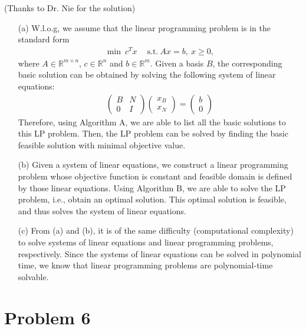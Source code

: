 \documentclass[12pt]{article}
\begin{document}
(Thanks to Dr. Nie for the solution)

\begin{itemize}
	\item[(a)] W.l.o.g, we assume that the linear programming problem is in the standard form \begin{align*}
	\min ~c^Tx~\quad\text{s.t.} ~Ax=b, ~x\geq 0,
	\end{align*}where $A\in\mathbb{R}^{m\times n}$, $c\in\mathbb{R}^n$ and $b\in\mathbb{R}^m$. Given a basis $B$, the corresponding basic solution can be obtained by solving the following system of linear equations: 
	\begin{align*}
	\left( \begin{array}{ll} B & N \\ 0 & I \end{array}\right) \left( \begin{array}{l}x_B\\x_N\end{array}\right) =\left( \begin{array}{l}b\\0\end{array}\right)
	\end{align*}
	Therefore, using Algorithm A, we are able to list all the basic solutions to this LP problem. Then, the LP problem can be solved by finding the basic feasible solution with minimal objective value.
	
	\item[(b)] Given a system of linear equations, we construct a linear programming problem whose objective function is constant and feasible domain is defined by those linear equations. Using Algorithm B, we are able to solve the LP problem, i.e., obtain an optimal solution. This optimal solution is feasible, and thus solves the system of linear equations. 
	\item[(c)] From (a) and (b), it is of the same difficulty (computational complexity) to solve systems of linear equations and linear programming problems, respectively. Since the systems of linear equations can be solved in polynomial time, we know that linear programming problems are polynomial-time solvable. 
\end{itemize}


\section*{Problem 6}
\end{document}
